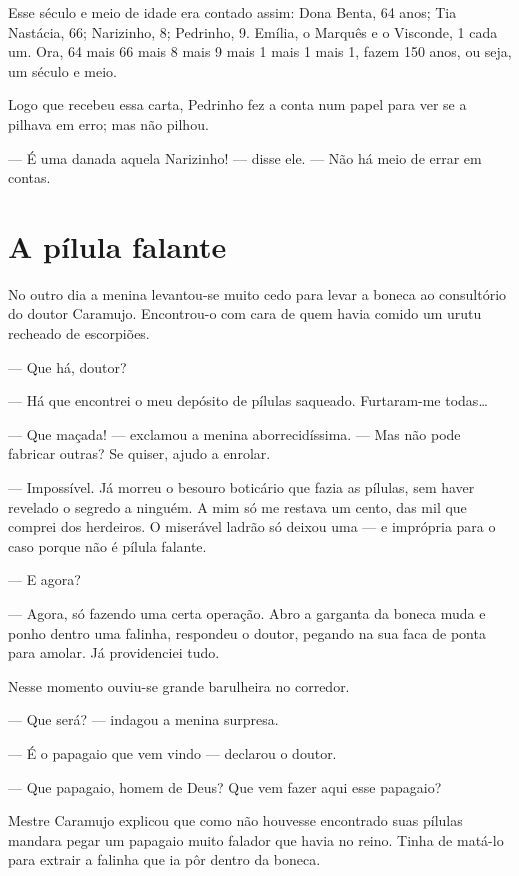 Esse século e meio de idade era contado assim: Dona Benta, 64 anos; Tia
Nastácia, 66; Narizinho, 8; Pedrinho, 9. Emília, o Marquês e o Visconde,
1 cada um. Ora, 64 mais 66 mais 8 mais 9 mais 1 mais 1 mais 1, fazem 150
anos, ou seja, um século e meio.

Logo que recebeu essa carta, Pedrinho fez a conta num papel para ver se
a pilhava em erro; mas não pilhou.

--- É uma danada aquela Narizinho! --- disse ele. --- Não há meio de
errar em contas.


\chapter{A pílula falante}

No outro dia a menina levantou-se muito cedo para levar a boneca ao
consultório do doutor Caramujo. Encontrou-o com cara de quem havia
comido um urutu recheado de escorpiões.

--- Que há, doutor?

--- Há que encontrei o meu depósito de pílulas saqueado. Furtaram-me
todas\ldots{}

--- Que maçada! --- exclamou a menina aborrecidíssima. --- Mas não pode
fabricar outras? Se quiser, ajudo a enrolar.

--- Impossível. Já morreu o besouro boticário que fazia as pílulas, sem
haver revelado o segredo a ninguém. A mim só me restava um cento, das
mil que comprei dos herdeiros. O miserável ladrão só deixou uma --- e
imprópria para o caso porque não é pílula falante.

--- E agora?

--- Agora, só fazendo uma certa operação. Abro a garganta da boneca muda
e ponho dentro uma falinha, respondeu o doutor, pegando na sua faca de
ponta para amolar. Já providenciei tudo.

Nesse momento ouviu-se grande barulheira no corredor.

--- Que será? --- indagou a menina surpresa.

--- É o papagaio que vem vindo --- declarou o doutor.

--- Que papagaio, homem de Deus? Que vem fazer aqui esse papagaio?

Mestre Caramujo explicou que como não houvesse encontrado suas pílulas
mandara pegar um papagaio muito falador que havia no reino. Tinha de
matá-lo para extrair a falinha que ia pôr dentro da boneca.

